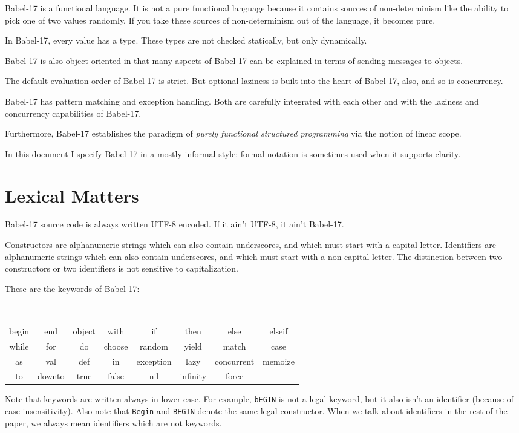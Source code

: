 \documentclass[11pt]{amsart}
\begin{document}
Babel-17 is a functional language. It is not a pure functional language because it contains sources of non-determinism like the ability to pick one of two values randomly. If you take these sources of non-determinism out of the language, it becomes pure. 

In Babel-17, every value has a type. These types are not checked statically, but only dynamically. 

Babel-17 is also object-oriented in that many aspects of Babel-17 can be explained in terms of sending messages to objects. 

The default evaluation order of Babel-17 is strict. But optional laziness is built into the heart of Babel-17, also, and so is concurrency. 

Babel-17 has pattern matching and exception handling. Both are carefully integrated with each other and with the laziness and concurrency capabilities of Babel-17.

Furthermore, Babel-17 establishes the paradigm of \emph{purely functional structured programming}  via the notion of linear scope.

In this document  I specify Babel-17 in a mostly informal style: formal notation is sometimes used when it supports clarity.

\section{Lexical Matters}
Babel-17 source code is always written UTF-8 encoded. If it ain't UTF-8, it ain't Babel-17. 

Constructors are alphanumeric strings which can also contain underscores, and which must start with a capital letter. 
Identifiers are alphanumeric strings which can also contain underscores, and which must start with a non-capital letter.
The distinction between two constructors or two identifiers is not sensitive to capitalization.

These are the keywords of Babel-17:
\begin{center}
\tt
\begin{tabular}{cccccccc}
begin & end & object & with & if & then & else & elseif \\
while &  for & do & choose & random & yield & match & case \\
as & val & def & in & exception & lazy & concurrent & memoize \\
to & downto & true & false & nil & infinity &  force & 
\end{tabular}
\end{center}
Note that keywords are written always in lower case. For example, {\tt bEGIN} is not a legal keyword, but it also isn't an identifier (because of case insensitivity). Also note that {\tt Begin} and {\tt BEGIN} denote the same legal constructor. When we talk about identifiers in the rest of the paper, we always mean identifiers which are not keywords.
\end{document}
